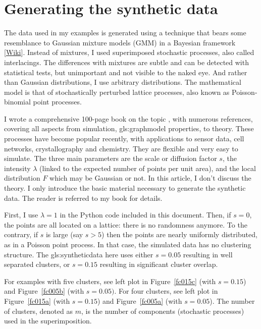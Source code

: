 \documentclass[oneside,10pt]{book}
\begin{document}

\section{Generating the synthetic data}

The data used in my examples is generated using a technique that bears some resemblance to 
\textcolor{index}{Gaussian mixture models} (GMM)
 in a Bayesian framework [\href{https://en.wikipedia.org/wiki/Mixture_model}{Wiki}]. Instead of mixtures, I used superimposed stochastic processes, also called interlacings. The differences with mixtures are subtle and can be detected with statistical tests, but unimportant and not visible to the naked eye. And
rather than Gaussian distributions, I use arbitrary distributions. The mathematical model is that of 
stochastically perturbed lattice processes, also known as Poisson-binomial point processes. 

I wrote a comprehensive 100-page book on the topic \cite{vgsimulnew}, with numerous references, covering all aspects from simulation, \gls{gls:graphmodel} properties, to theory. These processes have become popular recently, with applications to sensor data, cell networks, crystallography and chemistry. They are flexible and very easy to simulate. The three main parameters are the scale or diffusion factor $s$, the intensity $\lambda$ (linked to the expected number of points per unit area), and the local distribution $F$ which may be Gaussian or not. In this article, I don't discuss the theory.  I only introduce the basic material necessary to generate the synthetic data. The reader is referred to my book \cite{vgsimulnew} for details.

First, I use $\lambda=1$ in the Python code included in this document. Then, if $s=0$, the points are all located on a lattice: there is no randomness anymore. To the contrary, if $s$ is large (say $s>5$) then the points are nearly uniformly distributed, as in a Poisson point process. In that case, the simulated data has no clustering structure. The \gls{gls:syntheticdata} here uses either $s=0.05$ resulting in well separated clusters,
or $s=0.15$ resulting in significant cluster overlap. 

For examples with five clusters, see left plot 
in Figure~\ref{fc015c} (with $s=0.15$) and Figure~\ref{fc005b} (with $s=0.05)$. For four clusters, see left plot in Figure~\ref{fc015a} (with $s=0.15$) and Figure~\ref{fc005a}  
(with $s=0.05$).  The number of clusters, denoted as $m$, is the number of components (stochastic processes) used in the superimposition. 
\end{document}
